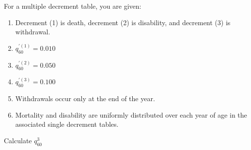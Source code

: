 For a multiple decrement table, you are given:
\begin{enumerate}
\item Decrement (1) is death, decrement (2) is disability, and decrement (3) is
withdrawal.
\item $q_{60}^{'(1)} = 0.010$
\item $q_{60}^{'(2)} = 0.050$
\item $q_{60}^{'(3)} = 0.100$
\item Withdrawals occur only at the end of the year.
\item Mortality and disability are uniformly distributed over each year of age in the
associated single decrement tables.
\end{enumerate}
Calculate $q_{60}^{3}$
